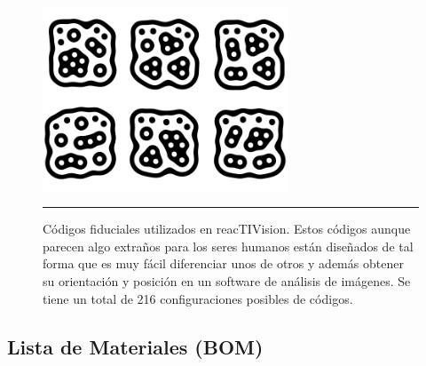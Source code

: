 \begin{figure}[htbp]
	\centering
		\includegraphics[width=0.65\textwidth]{./Figures/MODI/fiducial.png}
		\rule{35em}{0.5pt}
	\caption[Fiduciales usados como tag en reacTIVision]{Códigos fiduciales utilizados en reacTIVision. Estos códigos aunque parecen algo extraños para los seres humanos están diseñados de tal forma que es muy fácil diferenciar unos de otros y además obtener su orientación y posición en un software de análisis de imágenes. Se tiene un total de 216 configuraciones posibles de códigos.}
	\label{fig:Fiducial}
\end{figure}




\subsection{Lista de Materiales (BOM)}

